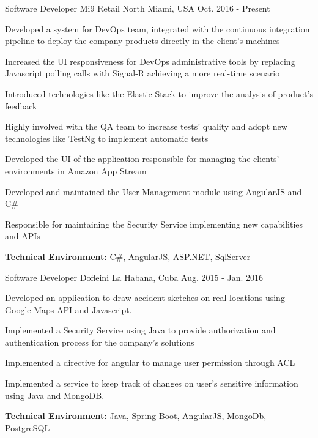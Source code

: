 
\begin{cventries}


\workexperienceentry
{Software Developer} %
{Mi9 Retail} %
{North Miami, USA} %
{Oct. 2016 - Present} %
{ %
\begin{cvitems}
    \item {Developed a system for DevOps team, integrated with the continuous integration pipeline to deploy the company products directly in the client's machines}
    \item {Increased the UI responsiveness for DevOps administrative tools by replacing Javascript polling calls with Signal-R achieving a more real-time scenario}
    \item {Introduced technologies like the Elastic Stack to improve the analysis of  product's feedback}  
    \item {Highly involved with the QA team to increase tests' quality and adopt new technologies like TestNg to implement automatic tests}
    \item {Developed the UI of the application responsible for managing the clients' environments in Amazon App Stream}
    \item {Developed and maintained the User Management module using AngularJS and C\#}
    \item {Responsible for maintaining the Security Service implementing new capabilities and APIs}
\end{cvitems}
}
{\textbf{Technical Environment:} C\#, AngularJS, ASP.NET, SqlServer}


\workexperienceentry
{Software Developer} %
{Dofleini} %
{La Habana, Cuba} %
{Aug. 2015 - Jan. 2016} %
{ %
\begin{cvitems}
	\item {Developed an application to draw accident sketches on real locations using Google Maps API and
		Javascript.}
	\item {Implemented a Security Service using Java to provide authorization and authentication
	process for the company's solutions}
	\item {Implemented a directive for angular to manage user permission through ACL}
	\item {Implemented a service to keep track of changes on user's sensitive information using Java and MongoDB.}
\end{cvitems}
}
{\textbf{Technical Environment:} Java, Spring Boot, AngularJS, MongoDb, PostgreSQL}



\end{cventries}
